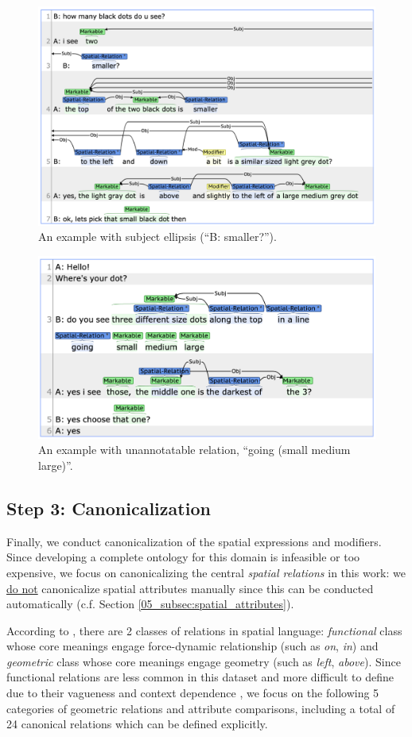\begin{figure}[t!]
\centering
\includegraphics[width=0.6\columnwidth]{C_3bc6ee0e230445ab98661b03f6903ae5.pdf}
\caption{An example with subject ellipsis (``B: smaller?'').}
\label{05_fig:subject_ellipsis}
\end{figure}

\begin{figure}[t!]
\centering
\includegraphics[width=0.6\columnwidth]{C_0e7e8399d1b64b598bcafa58976c05ac.pdf}
\caption{An example with unannotatable relation, ``going (small medium large)''.}
\label{05_fig:unannotatable}
\end{figure}

\subsection{Step 3: Canonicalization}
\label{05_subsec:canonicalization}

Finally, we conduct canonicalization of the spatial expressions and modifiers. Since developing a complete ontology for this domain is infeasible or too expensive, we focus on canonicalizing the central \textit{spatial relations} in this work: we \underline{do not} canonicalize spatial attributes manually since this can be conducted automatically (c.f. Section \ref{05_subsec:spatial_attributes}).

According to \citet{landau2017update}, there are 2 classes of relations in spatial language: \textit{functional} class whose core meanings engage force-dynamic relationship (such as \textit{on}, \textit{in}) and \textit{geometric} class whose core meanings engage geometry (such as \textit{left}, \textit{above}). Since functional relations are less common in this dataset and more difficult to define due to their vagueness and context dependence \citep{platonov2018computational}, we focus on the following 5 categories of geometric relations and attribute comparisons, including a total of 24 canonical relations which can be defined explicitly.

